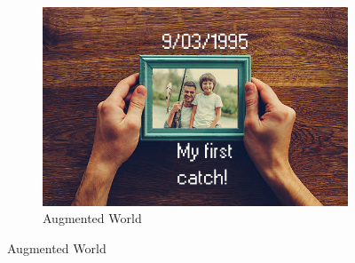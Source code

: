 \begin{figure}[htbp]
\begin{subfigure}[t]{0.3\textwidth}
    \includegraphics[width=\linewidth]{Images/DemVR/AugmentedWorld.png}
\caption{Augmented World}
\label{fig:AugmentedWorld}
\end{subfigure}


\end{figure}
